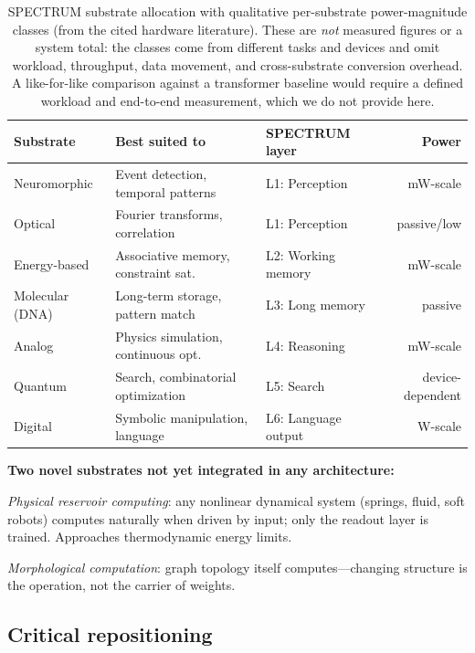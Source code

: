 \documentclass[12pt]{article}
\begin{document}
\begin{table}[H]
\centering\small
\begin{tabular}{lp{3.5cm}p{3cm}r}
\toprule
\textbf{Substrate} & \textbf{Best suited to} & \textbf{SPECTRUM layer} & \textbf{Power}\\
\midrule
Neuromorphic \cite{davies2021} & Event detection, temporal patterns & L1: Perception & mW-scale\\
Optical \cite{goodman2005} & Fourier transforms, correlation    & L1: Perception & passive/low\\
Energy-based \cite{hopfield1982} & Associative memory, constraint sat.& L2: Working memory & mW-scale\\
Molecular (DNA) & Long-term storage, pattern match   & L3: Long memory & passive\\
Analog \cite{sarpeshkar2010} & Physics simulation, continuous opt.& L4: Reasoning & mW-scale\\
Quantum         & Search, combinatorial optimization & L5: Search & device-dependent\\
Digital         & Symbolic manipulation, language    & L6: Language output & W-scale\\
\bottomrule
\end{tabular}
\caption{SPECTRUM substrate allocation with qualitative per-substrate power-magnitude classes (from the cited hardware literature). These are \emph{not} measured figures or a system total: the classes come from different tasks and devices and omit workload, throughput, data movement, and cross-substrate conversion overhead. A like-for-like comparison against a transformer baseline would require a defined workload and end-to-end measurement, which we do not provide here.}
\end{table}

\textbf{Two novel substrates not yet integrated in any architecture:}

\textit{Physical reservoir computing}: any nonlinear dynamical system (springs, fluid, soft robots) computes naturally when driven by input; only the readout layer is trained. Approaches thermodynamic energy limits.

\textit{Morphological computation}: graph topology itself computes---changing structure is the operation, not the carrier of weights.

\subsection{Critical repositioning}
\end{document}
